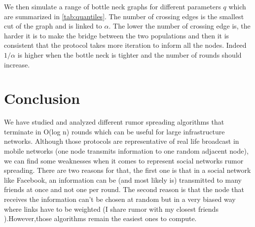 \documentclass[10pt,journal,a4paper]{IEEEtran}
\begin{document}
We then simulate a range of bottle neck graphs for different parameters $q$ which are summarized in \cref{tab:quantiles}. The number of crossing edges is the smallest cut of the graph and is linked to $\alpha$. The lower the number of crossing edge is, the harder it is to make the bridge between the two populations and then it is consistent that the protocol takes more iteration to inform all the nodes. Indeed $1/\alpha$ is higher when the bottle neck is tighter and the number of rounds should increase. 

\section{Conclusion}
 We have studied and analyzed different rumor spreading algorithms that terminate in O(log n) rounds which can be useful for large infrastructure networks. Although those protocols are representative of real life broadcast in mobile networks (one node transmits information to one random adjacent node), we can find some weaknesses when it comes to represent social networks rumor spreading. There are two reasons for that, the first one is that in a social network like Facebook, an information can be (and most likely is) transmitted to many friends at once and not one per round. The second reason is that the node that receives the information can’t be chosen at random but in a very biased way where links have to be weighted (I share rumor with my closest friends ).However,those algorithms remain the easiest ones to compute.
\end{document}
